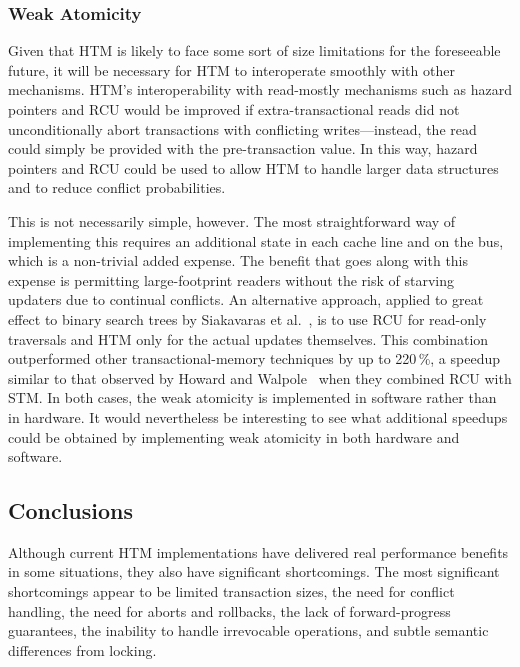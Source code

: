 \subsubsection{Weak Atomicity}
\label{sec:future:Weak Atomicity}

Given that HTM is likely to face some sort of size limitations for the
foreseeable future, it will be necessary for HTM to interoperate
smoothly with other mechanisms.
HTM's interoperability with read-mostly mechanisms such as hazard pointers
and RCU would be improved if extra-transactional reads did not
unconditionally abort transactions with conflicting writes---instead,
the read could simply be provided with the pre-transaction value.
In this way, hazard pointers and RCU could be used to allow HTM to handle
larger data structures and to reduce conflict probabilities.

This is not necessarily simple, however.
The most straightforward way of implementing this requires an additional
state in each cache line and on the bus, which is a non-trivial added
expense.
The benefit that goes along with this expense is permitting
large-footprint readers without the risk of starving updaters due
to continual conflicts.
An alternative approach, applied to great effect to binary search trees
by Siakavaras et al.~\cite{Siakavaras2017CombiningHA},
is to use RCU for read-only traversals and HTM
only for the actual updates themselves.
This combination outperformed other transactional-memory techniques by
up to 220\,\%, a speedup similar to that observed by
Howard and Walpole~\cite{PhilHoward2011RCUTMRBTree}
when they combined RCU with STM.
In both cases, the weak atomicity is implemented in software rather than
in hardware.
It would nevertheless be interesting to see what additional speedups
could be obtained by implementing weak atomicity in both hardware and
software.

\subsection{Conclusions}
\label{sec:future:Conclusions}

Although current HTM implementations have delivered real performance
benefits in some situations, they also have significant shortcomings.
The most significant shortcomings appear to be
limited transaction sizes,
the need for conflict handling, the need for aborts and rollbacks,
the lack of forward-progress guarantees,
the inability to handle irrevocable operations,
and subtle semantic differences
from locking.

